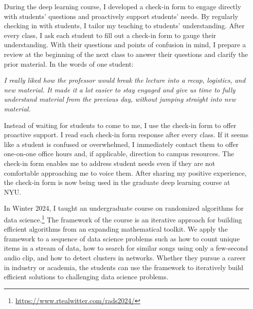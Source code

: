 \documentclass[11pt]{article}
\begin{document}
During the deep learning course, I developed a check-in form to engage directly with students' questions and proactively support students' needs.
By regularly checking in with students, I tailor my teaching to students' understanding.
After every class, I ask each student to fill out a check-in form to gauge their understanding.
With their questions and points of confusion in mind, I prepare a review at the beginning of the next class to answer their questions and clarify the prior material.
In the words of one student:
\begin{displayquote}
\textit{
I really liked how the professor would break the lecture into a recap, logistics, and new material. It made it a lot easier to stay engaged and give us time to fully understand material from the previous day, without jumping straight into new material.
}
\end{displayquote}

Instead of waiting for students to come to me, I use the check-in form to offer proactive support.
I read each check-in form response after every class.
If it seems like a student is confused or overwhelmed, I immediately contact them to offer one-on-one office hours and, if applicable, direction to campus resources.
The check-in form enables me to address student needs even if they are not comfortable approaching me to voice them.
After sharing my positive experience, the check-in form is now being used in the graduate deep learning course at NYU.


In Winter 2024, I taught an undergraduate course on randomized algorithms for data science.\footnote{\url{https://www.rtealwitter.com/rads2024/}}
The framework of the course is an iterative approach for building efficient algorithms from an expanding mathematical toolkit.
We apply the framework to a sequence of data science problems such as how to count unique items in a stream of data, how to search for similar songs using only a few-second audio clip, and how to detect clusters in networks.
Whether they pursue a career in industry or academia, the students can use the framework to iteratively build efficient solutions to challenging data science problems.
\end{document}
